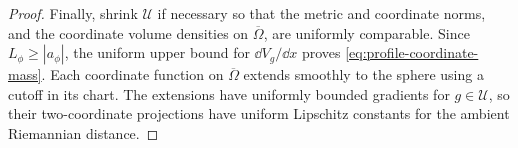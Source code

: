 \begin{proof}
Finally, shrink $\mathcal U$ if necessary so that the metric and
coordinate norms, and the coordinate volume densities on
$\overline\Omega$, are uniformly comparable.  Since $L_\phi\ge|a_\phi|$,
the uniform upper bound for $\dd V_g/\dd x$ proves
\eqref{eq:profile-coordinate-mass}.  Each coordinate function on
$\overline\Omega$ extends smoothly to the sphere using a cutoff in its
chart.  The extensions have uniformly bounded gradients for
$g\in\mathcal U$, so their two-coordinate projections have uniform
Lipschitz constants for the ambient Riemannian distance.
\end{proof}
